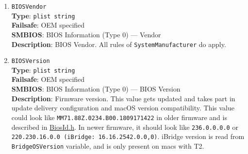 \documentclass[]{article}
\begin{document}
\begin{enumerate}
\item
  \texttt{BIOSVendor}\\
  \textbf{Type}: \texttt{plist\ string}\\
  \textbf{Failsafe}: OEM specified\\
  \textbf{SMBIOS}: BIOS Information (Type 0) --- Vendor\\
  \textbf{Description}: BIOS Vendor. All rules of
  \texttt{SystemManufacturer} do apply.
\item
  \texttt{BIOSVersion}\\
  \textbf{Type}: \texttt{plist\ string}\\
  \textbf{Failsafe}: OEM specified\\
  \textbf{SMBIOS}: BIOS Information (Type 0) --- BIOS Version\\
  \textbf{Description}: Firmware version. This value gets updated and
  takes part in update delivery configuration and macOS version
  compatibility. This value could look like
  \texttt{MM71.88Z.0234.B00.1809171422} in older firmware and is
  described in
  \href{https://github.com/acidanthera/OpenCorePkg/blob/master/Include/Apple/Guid/BiosId.h}{BiosId.h}.
  In newer firmware, it should look like \texttt{236.0.0.0.0} or
  \texttt{220.230.16.0.0\ (iBridge:\ 16.16.2542.0.0,0)}. iBridge version
  is read from \texttt{BridgeOSVersion} variable, and is only present on
  macs with T2.


\end{enumerate}
\end{document}
